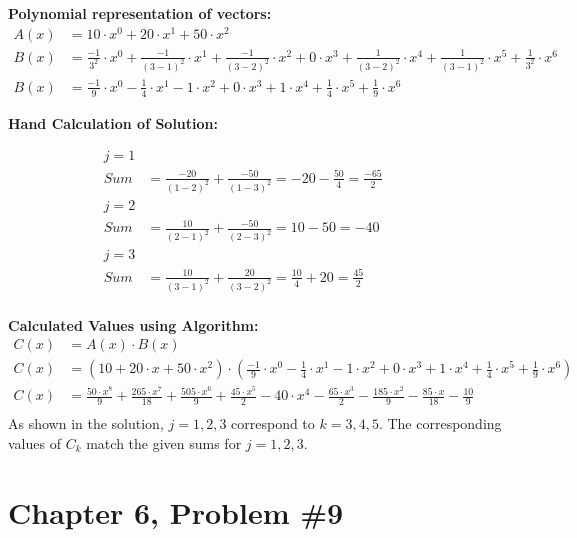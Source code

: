 \documentclass{article}
\begin{document}
\noindent \textbf{Polynomial representation of vectors:} 
\begin{align*}
A(x) &= 10 \cdot x^0 + 20 \cdot x^1 + 50 \cdot x^2 \\
B(x) &= \frac{-1}{3^2} \cdot x^0 + \frac{-1}{(3-1)^2}\cdot x^1 + \frac{-1}{(3-2)^2} \cdot x^2 + 0 \cdot x^3 + \frac{1}{(3-2)^2} \cdot x^4 + \frac{1}{(3-1)^2} \cdot x^5 + \frac{1}{3^2} \cdot x^6 \\
B(x) &= \frac{-1}{9} \cdot x^0 - \frac{1}{4} \cdot x^1 - 1 \cdot x^2 + 0 \cdot x^3 + 1 \cdot x^4 + \frac{1}{4} \cdot x^5 + \frac{1}{9} \cdot x^6
\end{align*}

\noindent \textbf{Hand Calculation of Solution:}

\begin{align*}
j = 1 & & & & \\
 Sum \, &= \frac{-20}{(1-2)^2} + \frac{-50}{(1-3)^2} = -20 - \frac{50}{4} = \frac{-65}{2} \\
j = 2 & & & & \\
 Sum \, &= \frac{10}{(2-1)^2} + \frac{-50}{(2-3)^2} = 10 - 50 = -40 \\
j = 3 & & & &\\
 Sum \, &= \frac{10}{(3-1)^2} + \frac{20}{(3-2)^2} = \frac{10}{4} + 20 = \frac{45}{2} \\
\end{align*}

\noindent \textbf{Calculated Values using Algorithm:}
\begin{align*}
C(x) &= A(x) \cdot B(x) \\
C(x) &= (10 + 20 \cdot x + 50 \cdot x^2) \cdot ( \frac{-1}{9} \cdot x^0 - \frac{1}{4} \cdot x^1 - 1 \cdot x^2 + 0 \cdot x^3 + 1 \cdot x^4 + \frac{1}{4} \cdot x^5 + \frac{1}{9} \cdot x^6 )\\
C(x) &= \frac{50 \cdot x^8}{9} + \frac{265 \cdot x^7}{18} + \frac{505 \cdot x^6}{9} + \frac{45 \cdot x^5}{2} - 40 \cdot x^4 - \frac{65 \cdot x^3}{2} - \frac{185 \cdot x^2}{9} - \frac{85 \cdot x}{18} - \frac{10}{9} \\
\end{align*}
As shown in the solution, $j = 1, 2, 3$ correspond to $k = 3, 4, 5$.  The corresponding values of $C_k$ match the given sums for $j = 1, 2, 3$.

\newpage

\section*{Chapter 6, Problem \#9 }
\end{document}
